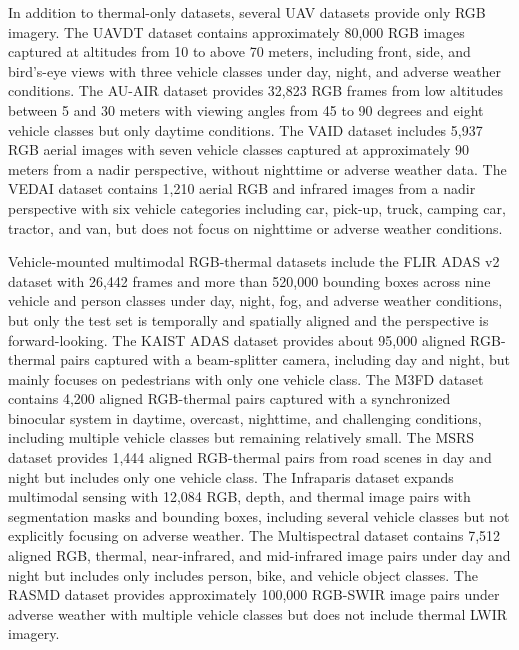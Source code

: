 \documentclass[12pt,oneside,bibtotoc,liststotoc]{scrbook}
\begin{document}
In addition to thermal-only datasets, several UAV datasets provide only RGB
imagery. The UAVDT dataset \cite{du2018UAVDTDataset} contains approximately
80,000 RGB images captured at altitudes from 10 to above 70 meters, including
front, side, and bird's-eye views with three vehicle classes under day, night,
and adverse weather conditions. The AU-AIR dataset \cite{bozcan2020auAirDataset}
provides 32,823 RGB frames from low altitudes between 5 and 30 meters with
viewing angles from 45 to 90 degrees and eight vehicle classes but only daytime
conditions. The VAID dataset \cite{li2020aerialVehicleDetectionVAIDDataset}
includes 5,937 RGB aerial images with seven vehicle classes captured at
approximately 90 meters from a nadir perspective, without nighttime or
adverse weather data. The VEDAI dataset \cite{razakarivony2016VEDAIdataset}
contains 1,210 aerial RGB and infrared images from a nadir perspective
with six vehicle categories including car, pick-up, truck, camping car,
tractor, and van, but does not focus on nighttime or adverse weather conditions.

Vehicle-mounted multimodal RGB-thermal datasets include the FLIR ADAS v2
dataset \cite{teledyne_2022_flirAdasV2Dataset} with 26,442 frames and more
than 520,000 bounding boxes across nine vehicle and person classes under day,
night, fog, and adverse weather conditions, but only the test set is temporally
and spatially aligned and the perspective is forward-looking. The KAIST ADAS
dataset \cite{choi2018kaist} provides about 95,000 aligned RGB-thermal pairs
captured with a beam-splitter camera, including day and night, but mainly
focuses on pedestrians with only one vehicle class. The M3FD dataset
\cite{liu2022m3fdDataset} contains 4,200 aligned RGB-thermal pairs captured
with a synchronized binocular system in daytime, overcast, nighttime, and
challenging conditions, including multiple vehicle classes but remaining
relatively small. The MSRS dataset \cite{tang2022piafusionMSRSDataset} provides
1,444 aligned RGB-thermal pairs from road scenes in day and night but includes
only one vehicle class. The Infraparis dataset
\cite{franchi2024infraparisRGBDepthThermalDataset} expands multimodal sensing
with 12,084 RGB, depth, and thermal image pairs with segmentation masks and
bounding boxes, including several vehicle classes but not explicitly focusing
on adverse weather. The Multispectral dataset
\cite{takumi2017multispectralDatasetAutonomousVehicles} contains 7,512 aligned
RGB, thermal, near-infrared, and mid-infrared image pairs under day and night
but includes only includes person, bike, and vehicle object classes. The RASMD
dataset \cite{jin2026rasmd} provides approximately 100,000 RGB-SWIR image
pairs under adverse weather with multiple vehicle classes but does not include
thermal LWIR imagery.
\end{document}
